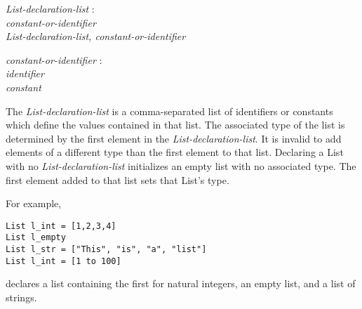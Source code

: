 \documentclass{article}
\begin{document}
\begin{tabbing}
	\= \emph{List}\=\emph{-declaration-list} : \\
		\> \> \emph{constant-or-identifier} \\
		\>\> \emph{List-declaration-list, constant-or-identifier}
\end{tabbing}
\begin{tabbing}
	\= \emph{const}\=\emph{ant-or-identifier} : \\
		\> \> \emph{identifier} \\
		\>\> \emph{constant}
\end{tabbing}

The \emph{List-declaration-list} is a comma-separated list of identifiers or constants which define the values contained in that list. The associated type of the list is determined by the first element in the \emph{List-declaration-list}. It is invalid to add elements of a different type than the first element to that list. Declaring a List with no \emph{List-declaration-list} initializes an empty list with no associated type. The first element added to that list sets that List's type. 

For example,
\begin{lstlisting}
List l_int = [1,2,3,4]
List l_empty
List l_str = ["This", "is", "a", "list"]
List l_int = [1 to 100]
\end{lstlisting}
declares a list containing the first for natural integers, an empty list, and a list of strings.
\end{document}
